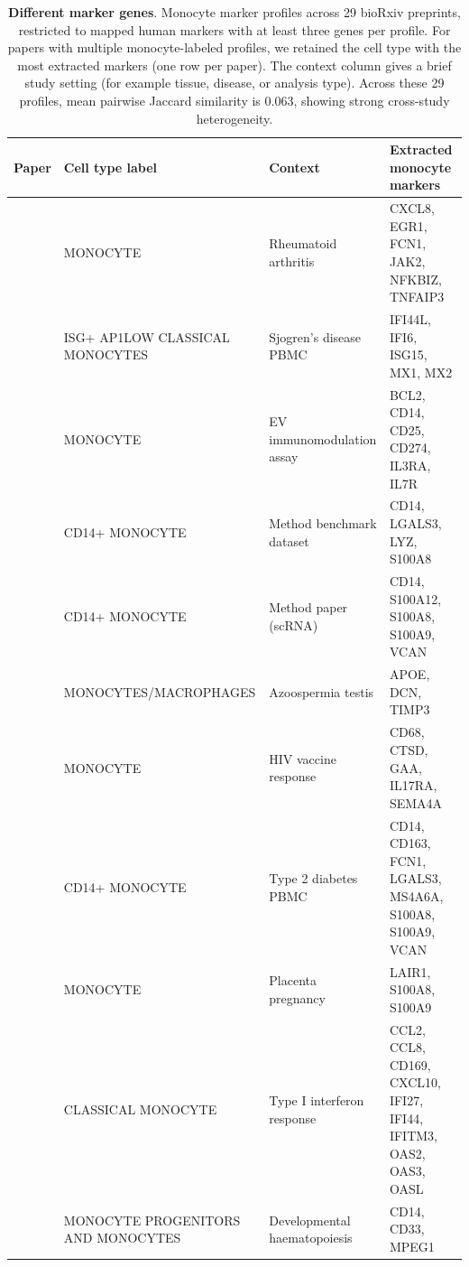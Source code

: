 \documentclass[10pt,twocolumn]{article}
\theoremstyle{plain}
\theoremstyle{definition}
\theoremstyle{remark}
\begin{document}
\begin{table}[ht!]
  \centering
  \caption{\textbf{Different marker genes}. Monocyte marker profiles across 29 bioRxiv preprints, restricted to mapped human markers with at least three genes per profile. For papers with multiple monocyte-labeled profiles, we retained the cell type with the most extracted markers (one row per paper). The context column gives a brief study setting (for example tissue, disease, or analysis type). Across these 29 profiles, mean pairwise Jaccard similarity is 0.063, showing strong cross-study heterogeneity.}
  \label{tab:monocyte_papers}%
  \footnotesize
  \setlength{\tabcolsep}{3pt}
  \begin{tabular}{@{}l p{3.6cm} p{2.7cm} p{7.1cm}@{}}
  \toprule
  Paper & Cell type label & Context & Extracted monocyte markers \\
  \midrule
  \citep{Preglej2025} & MONOCYTE & Rheumatoid arthritis & CXCL8, EGR1, FCN1, JAK2, NFKBIZ, TNFAIP3  \\ [4pt]
  \citep{Urbanski2025biorxiv640483} & ISG+ AP1LOW CLASSICAL MONOCYTES & Sjogren's disease PBMC & IFI44L, IFI6, ISG15, MX1, MX2  \\ [4pt]
  \citep{Bachurski2025} & MONOCYTE & EV immunomodulation assay & BCL2, CD14, CD25, CD274, IL3RA, IL7R  \\ [4pt]
  \citep{Imoto2025} & CD14+ MONOCYTE & Method benchmark dataset & CD14, LGALS3, LYZ, S100A8  \\ [4pt]
  \citep{Wang2020celda} & CD14+ MONOCYTE & Method paper (scRNA) & CD14, S100A12, S100A8, S100A9, VCAN  \\ [4pt]
  \citep{Wu2022biorxiv520033} & MONOCYTES/\allowbreak MACROPHAGES & Azoospermia testis & APOE, DCN, TIMP3  \\ [4pt]
  \citep{Shangguan2021} & MONOCYTE & HIV vaccine response & CD68, CTSD, GAA, IL17RA, SEMA4A  \\ [4pt]
  \citep{Zhao2024} & CD14+ MONOCYTE & Type 2 diabetes PBMC & CD14, CD163, FCN1, LGALS3, MS4A6A, S100A8, S100A9, VCAN  \\ [4pt]
  \citep{Obolenska2025} & MONOCYTE & Placenta pregnancy & LAIR1, S100A8, S100A9  \\ [4pt]
  \citep{Rigby2023} & CLASSICAL MONOCYTE & Type I interferon response & CCL2, CCL8, CD169, CXCL10, IFI27, IFI44, IFITM3, OAS2, OAS3, OASL  \\ [4pt]
  \citep{MariaRanzoni2020biorxiv080259} & MONOCYTE PROGENITORS AND MONOCYTES & Developmental haematopoiesis & CD14, CD33, MPEG1  \\ [4pt]

\end{tabular}
\end{table}
\end{document}
